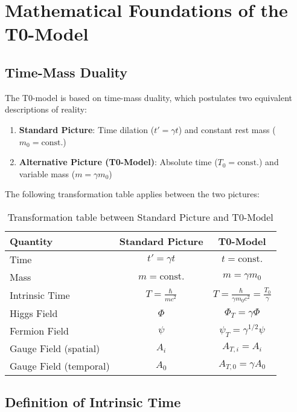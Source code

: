 \documentclass[a4paper,12pt]{article}
\theoremstyle{definition}
\theoremstyle{remark}
\begin{document}
	\section{Mathematical Foundations of the T0-Model}
	
	\subsection{Time-Mass Duality}
	
	The T0-model is based on time-mass duality, which postulates two equivalent descriptions of reality:
	
	\begin{enumerate}
		\item \textbf{Standard Picture}: Time dilation (\(t' = \gamma t\)) and constant rest mass (\(m_0 = \text{const.}\))
		\item \textbf{Alternative Picture (T0-Model)}: Absolute time (\(T_0 = \text{const.}\)) and variable mass (\(m = \gamma m_0\))
	\end{enumerate}
	
	The following transformation table applies between the two pictures:
	
	\begin{table}[h]
		\centering
		\begin{tabular}{|l|c|c|}
			\hline
			\textbf{Quantity} & \textbf{Standard Picture} & \textbf{T0-Model} \\
			\hline
			Time & \(t' = \gamma t\) & \(t = \text{const.}\) \\
			Mass & \(m = \text{const.}\) & \(m = \gamma m_0\) \\
			Intrinsic Time & \(T = \frac{\hbar}{mc^2}\) & \(T = \frac{\hbar}{\gamma m_0c^2} = \frac{T_0}{\gamma}\) \\
			Higgs Field & \(\Phi\) & \(\Phi_T = \gamma \Phi\) \\
			Fermion Field & \(\psi\) & \(\psi_T = \gamma^{1/2} \psi\) \\
			Gauge Field (spatial) & \(A_i\) & \(A_{T,i} = A_i\) \\
			Gauge Field (temporal) & \(A_0\) & \(A_{T,0} = \gamma A_0\) \\
			\hline
		\end{tabular}
		\caption{Transformation table between Standard Picture and T0-Model} %
	\end{table}
	
	\subsection{Definition of Intrinsic Time}
	
\end{document}
